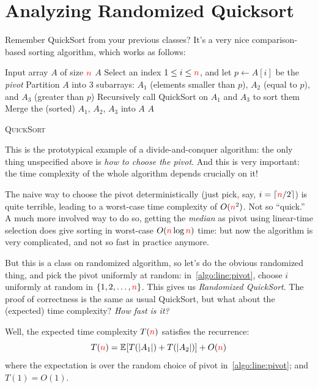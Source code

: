 \section{Analyzing Randomized Quicksort}

Remember QuickSort from your previous classes? It's a very nice comparison-based sorting algorithm, which works as follows:
\begin{algorithm}
\begin{algorithmic}[1]
    \Require Input array $A$ of size ${\textcolor{red}{n}}$
     \Return $A$
    \EndIf
    \State\label{algo:line:pivot} Select an index $1\leq i\leq {\textcolor{red}{n}}$, and let $p \gets A[i]$ be the \emph{pivot}
    \State Partition $A$ into 3 subarrays: $A_1$ (elements smaller than $p$), $A_2$ (equal to $p$), and $A_3$ (greater than $p$) 
    \State Recursively call QuickSort on $A_1$ and $A_3$ to sort them
    \State Merge the (sorted) $A_1$, $A_2$, $A_3$ into $A$ 
    \State \Return $A$
\end{algorithmic}
\caption{\textsc{QuickSort}}
\end{algorithm}
This is the prototypical example of a divide-and-conquer algorithm: the only thing unspecified above is \emph{how to choose the pivot}. And this is very important: the time complexity of the whole algorithm depends crucially on it!

The naive way to choose the pivot deterministically (just pick, say, $i=\left\lceil {\textcolor{red}{n}}/2 \right\rceil$) is quite terrible, leading to a worst-case time complexity of $O({\textcolor{red}{n}}^2)$. Not so ``quick.'' A much more involved way to do so, getting the \emph{median} as pivot using linear-time selection does give sorting in worst-case $O({\textcolor{red}{n}}\log{\textcolor{red}{n}})$ time: but now the algorithm is very complicated, and not so fast in practice anymore.

But this is a class on randomized algorithm, so let's do the obvious randomized thing, and pick the pivot uniformly at random: in~\cref{algo:line:pivot}, choose $i$ uniformly at random in $\{1,2,\dots,{\textcolor{red}{n}}\}$. This gives us \emph{Randomized QuickSort}. The proof of correctness is the same as usual QuickSort, but what about the (expected) time complexity? \emph{How fast is it?}

Well, the expected time complexity $T({\textcolor{red}{n}})$ satisfies the recurrence:
\begin{equation}
    \label{eq:quicksort}
T(\ns) = \bEE{T(|A_1|) + T(|A_2|)} + O(\ns)
\end{equation}
where the expectation is over the random choice of pivot in~\cref{algo:line:pivot}; and $T(1) = O(1)$.

